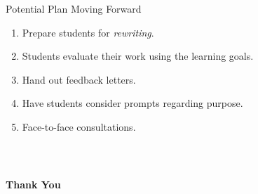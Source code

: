 \documentclass{beamer}
\newcommand{\be}{\begin{enumerate}}
\newcommand{\ee}{\end{enumerate}}
\begin{document}
{  \begin{block}{Potential Plan Moving Forward}
    \be
    \item Prepare students for \textit{rewriting}.
    \item Students evaluate their work using the learning goals.
    \item Hand out feedback letters.
    \item Have students consider prompts regarding purpose.
    \item Face-to-face consultations.
    \ee
  \end{block}
}

\frame
{
  \frametitle{~}
  \begin{center}\LARGE{\textbf{Thank You}}\end{center}
}
\end{document}
